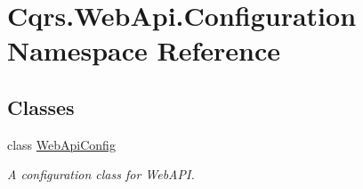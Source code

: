\hypertarget{namespaceCqrs_1_1WebApi_1_1Configuration}{}\section{Cqrs.\+Web\+Api.\+Configuration Namespace Reference}
\label{namespaceCqrs_1_1WebApi_1_1Configuration}
\subsection*{Classes}
\begin{DoxyCompactItemize}
\item 
class \hyperlink{classCqrs_1_1WebApi_1_1Configuration_1_1WebApiConfig}{Web\+Api\+Config}
\begin{DoxyCompactList}\small\item\em A configuration class for Web\+A\+PI. \end{DoxyCompactList}\end{DoxyCompactItemize}
